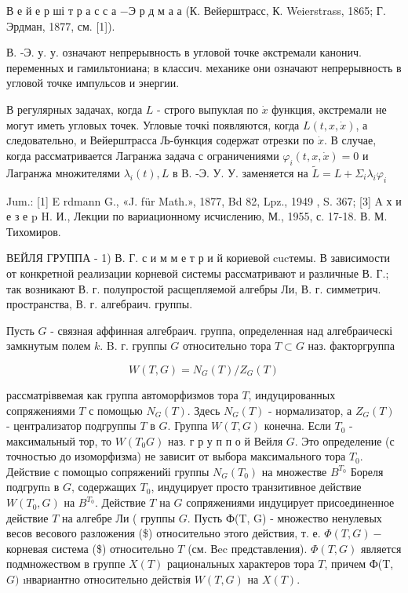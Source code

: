\documentclass[10pt]{article}
\begin{document}
В е й е р ші т р а с с а $-Э$ р д м а а (К. Вейерштрасс, К. Weierstrass, 1865; Г. Эрдман, 1877, см. [1]).



В. -Э. у. у. означают непрерывность в угловой точке әкстремали канонич. переменных и гамильтониана; в классич. механике они означают непрерывность в угловой точке импульсов и энергии.



В регулярных задачах, когда $L$ - строго выпуклая по $\dot{x}$ функция, әкстремали не могут иметь угловых точек. Угловые точкі появляются, когда $L(t, x, \dot{x})$, а следовательно, и Вейерштрасса Љ-бункция содержат отрезки по $\dot{x}$. В случае, когда рассматривается Лагранжа задача с ограничениями $\varphi_{i}(t, x, \dot{x})=0$ и Лагранжа множителями $\lambda_{i}(t), L$ в В. -Э. У. У. заменяется на $\tilde{L}=L+\Sigma_{i} \lambda_{i} \varphi_{i}$



Jum.: [1] E rdmann G., «J. für Math.», 1877, Bd 82, Lpz., 1949 , S. 367; [3] A х и е з е p H. И., Лекции по вариационному исчислению, М., 1955, с. 17-18. В. М. Тихомиров.



ВЕЙЛЯ ГРУППА - 1) В. Г. с и м м е т р и й кориевой cucтемы. В зависимости от конкретной реализации корневой системы рассматривают и различные В. Г.; так возникают В. г. полупростой расщепляемой алгебры Ли, В. г. симметрич. пространства, В. г. алгебраич. группы.



Пусть $G$ - связная аффинная алгебраич. группа, определенная над алгебраическі замкнутым полем $k$. B. г. группы $G$ относительно тора $T \subset G$ наз. факторгруппа



\[

W(T, G)=N_{G}(T) / Z_{G}(T)

\]



рассматріввемая как группа автоморфизмов тора $T$, индуцированных сопряжениями $T$ с помощью $N_{G}(T)$. Здесь $N_{G}(T)$ - нормализатор, а $Z_{G}(T)$ - централизатор подгруппы $T$ в $G$. Группа $W(T, G)$ конечна. Если $T_{0}$ - максимальный тор, то $W\left(T_{0} G\right)$ наз. г р у п п о й Вейля $G$. Это определение (с точностью до изоморфизма) не зависит от выбора максимального тора $T_{0}$. Действие с помощыо сопряженийі группы $N_{G}\left(T_{0}\right)$ на множестве $B^{T_{0}}$ Бореля подгрупn в $G$, содержащих $T_{0}$, индуцирует просто транзитивное действие $W\left(T_{0}, G\right)$ на $B^{T_{0}}$. Действие $T$ на $G$ сопряжениями индуцирует присоединенное действие $T$ на алгебре Ли ( группы $G$. Пусть Ф(T, G) - множество ненулевых весов весового разложения (\$) относительно этого действия, т. е. $\Phi(T, G)-$ корневая система (\$) относительно $T$ (см. Вec представления). $\Phi(T, G)$ является подмножеством в группе $X(T)$ рациональных характеров тора $T$, причем Ф(T, $G)$ ıнвариантно относительно действія $W(T, G)$ на $X(T)$.
\end{document}
